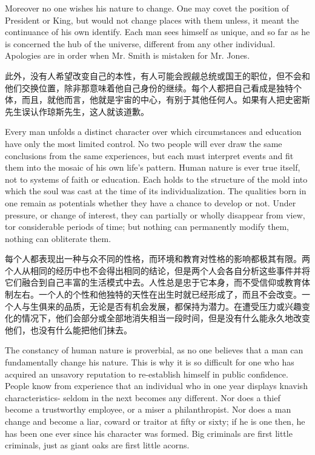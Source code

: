 \documentclass[cs4size, a4paper,12pt]{article}
\newcounter{numpar}
\newcommand*{\newpar}{\numpar{}}
\begin{document}
\newpar  Moreover no one wishes his nature to change. One may covet the position of President or King, but would not change places with them unless, it meant the continuance of his own identify. Each man sees himself as unique, and so far as he is concerned the hub of the universe, different from any other individual. Apologies are in order when Mr. Smith is mistaken for Mr. Jones.

此外，没有人希望改变自己的本性，有人可能会觊觎总统或国王的职位，但不会和他们交换位置，除非那意味着他自己身份的继续。每个人都把自己看成是独特个体，而且，就他而言，他就是宇宙的中心，有别于其他任何人。如果有人把史密斯先生误认作琼斯先生，这人就该道歉。

\newpar Every man unfolds a distinct character over which circumstances and education have only the most limited control. No two people will ever draw the same conclusions from the same experiences, but each must interpret events and fit them into the mosaic of his own life's pattern. Human nature is ever true itself, not to systems of faith or education. Each holds to the structure of the mold into which the soul was cast at the time of its individualization. The qualities born in one remain as potentials whether they have a chance to develop or not. Under pressure, or change of interest, they can partially or wholly disappear from view, tor considerable periods of time; but nothing can permanently modify them, nothing can obliterate them.

每个人都表现出一种与众不同的性格，而环境和教育对性格的影响都极其有限。两个人从相同的经历中也不会得出相同的结论，但是两个人会各自分析这些事件并将它们融合到自己丰富的生活模式中去。人性总是忠于它本身，而不受信仰或教育体制左右。一个人的个性和他独特的天性在出生时就已经形成了，而且不会改变。一个人与生俱来的品质，无论是否有机会发展，都保持为潜力。在遭受压力或兴趣变化的情况下，他们会部分或全部地消失相当一段时间，但是没有什么能永久地改变他们，也没有什么能把他们抹去。

\newpar The constancy of human nature is proverbial, as no one believes that a man can fundamentally change his nature. This is why it is so difficult for one who has acquired
an unsavory reputation to re-establish himself in public confidence. People know from
experience that an individual who in one year displays knavish characteristics- seldom
in the next becomes any different. Nor does a thief become a trustworthy employee, or a miser a philanthropist. Nor does a man change and become a liar, coward or traitor at fifty or sixty; if he is one then, he has been one ever since his character was formed. Big criminals are first little criminals, just as giant oaks are first little acorns.
\end{document}
